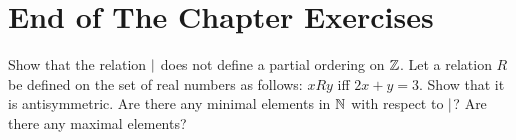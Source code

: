 \section*{End of The Chapter Exercises}
\begin{exercises}
  \exercise Show that the relation $\mid$ does not define a partial
    ordering on $\mathbb{Z}$.
  \exercise Let a relation $R$ be defined on the set of real numbers as
    follows: $x R y$ iff $2x + y = 3$. Show that it is antisymmetric.
  \exercise Are there any minimal elements in $\mathbb{N}$ with respect to
    $\mid$? Are there any maximal elements?
\end{exercises}
